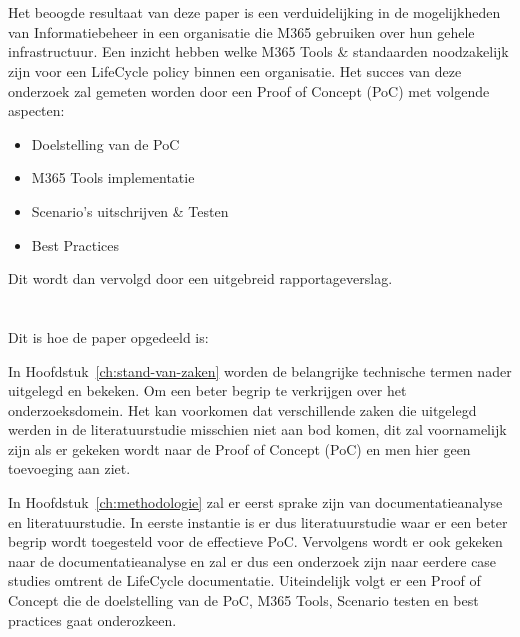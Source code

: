 \section{}%
\label{sec:onderzoeksdoelstelling}

Het beoogde resultaat van deze paper is een verduidelijking in de mogelijkheden van Informatiebeheer in een organisatie die M365 gebruiken over hun gehele infrastructuur.
Een inzicht hebben welke M365 Tools & standaarden noodzakelijk zijn voor een LifeCycle policy binnen een organisatie.
Het succes van deze onderzoek zal gemeten worden door een Proof of Concept (PoC) met volgende aspecten:
\begin{itemize}
  \item Doelstelling van de PoC
  \item M365 Tools implementatie
  \item Scenario's uitschrijven \& Testen
  \item Best Practices
\end{itemize}

Dit wordt dan vervolgd door een uitgebreid rapportageverslag.

\section{}%
\label{sec:opzet-bachelorproef}


Dit is hoe de paper opgedeeld is:

In Hoofdstuk~\ref{ch:stand-van-zaken} worden de belangrijke technische termen nader uitgelegd en bekeken. Om een beter begrip te verkrijgen over het onderzoeksdomein.
Het kan voorkomen dat verschillende zaken die uitgelegd werden in de literatuurstudie misschien niet aan bod komen, dit zal voornamelijk zijn als er gekeken wordt naar de Proof of Concept (PoC) en men hier geen toevoeging aan ziet.

In Hoofdstuk~\ref{ch:methodologie} zal er eerst sprake zijn van documentatieanalyse en literatuurstudie. In eerste instantie is er dus literatuurstudie waar er een beter begrip wordt toegesteld voor de effectieve PoC.
Vervolgens wordt er ook gekeken naar de documentatieanalyse en zal er dus een onderzoek zijn naar eerdere case studies omtrent de LifeCycle documentatie.
Uiteindelijk volgt er een Proof of Concept die de doelstelling van de PoC, M365 Tools, Scenario testen en best practices gaat onderozkeen.

